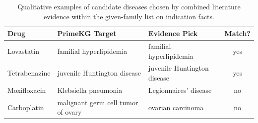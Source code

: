 \begin{table}[ht]
\centering
\small
\setlength{\tabcolsep}{3pt}
\begin{tabular}{>{\raggedright\arraybackslash}p{1.85cm}>{\raggedright\arraybackslash}p{2.35cm}>{\raggedright\arraybackslash}p{2.2cm}c}
\toprule
Drug & PrimeKG Target & Evidence Pick & Match? \\
\midrule
Lovastatin & familial hyperlipidemia & familial hyperlipidemia & yes \\
Tetrabenazine & juvenile Huntington disease & juvenile Huntington disease & yes \\
Moxifloxacin & Klebsiella pneumonia & Legionnaires' disease & no \\
Carboplatin & malignant germ cell tumor of ovary & ovarian carcinoma & no \\
\bottomrule
\end{tabular}
\caption{Qualitative examples of candidate diseases chosen by combined literature evidence within the given-family list on indication facts.}
\label{tab:examples}
\end{table}